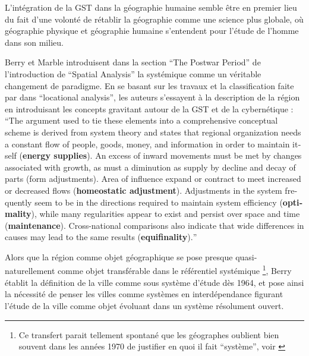 L'intégration de la GST dans la géographie humaine semble être en premier lieu du fait d'une volonté de rétablir la géographie comme une science plus globale, où géographie physique et géographie humaine s'entendent pour l'étude de l'homme dans son milieu.

Berry et Marble introduisent dans la section \foreignquote{english}{The Postwar Period} de l'introduction de \foreignquote{english}{Spatial Analysis} la systémique comme un véritable changement de paradigme. En se basant sur les travaux et la classification faite par \textcite{Haggett1965} dans \foreignquote{english}{locational analysis}, les auteurs s'essayent à la description de la région en introduisant les concepts gravitant autour de la GST et de la cybernétique : \foreignquote{english}{The argument used to tie these elements into a comprehensive conceptual scheme is derived from system theory and states that regional organization needs a constant flow of people, goods, money, and information in order to maintain itself (\textbf{energy supplies}). An excess of inward movements must be met by changes associated with growth, as must a diminution as supply by decline and decay of parts (form adjustments). Area of influence expand or contract to meet increased or decreased flows (\textbf{homeostatic adjustment}). Adjustments in the system frequently seem to be in the directions required to maintain system efficiency (\textbf{optimality}), while many regularities appear to exist and persist over space and time (\textbf{maintenance}). Cross-national comparisons also indicate that wide differences in causes may lead to the same results (\textbf{equifinality}).}

Alors que la région comme objet géographique se pose presque quasi-naturellement comme objet transférable dans le référentiel systémique \footnote{Ce transfert parait tellement spontané que les géographes oublient bien souvent dans les années 1970 de justifier en quoi il fait \enquote{système}, voir \autocite{Orain2001}}, Berry établit la définition de la ville comme sous système d'étude dès 1964, et pose ainsi la nécessité de penser les villes comme systèmes en interdépendance figurant l'étude de la ville comme objet évoluant dans un système résolument ouvert.

